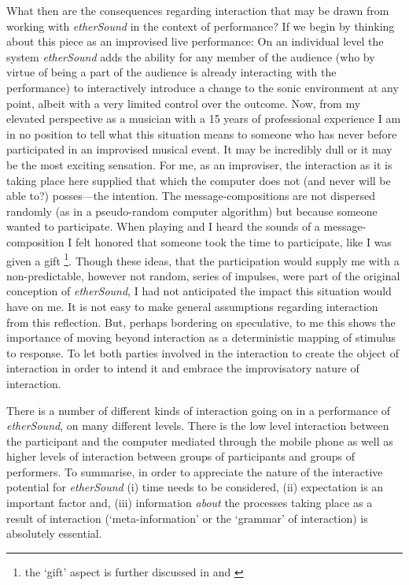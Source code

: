 What then are the consequences regarding interaction that may be drawn from working with \emph{etherSound} in the context of performance? If we begin by thinking about this piece as an improvised live performance: On an individual level the system \emph{etherSound} adds the ability for any member of the audience (who by virtue of being a part of the audience is already interacting with the performance) to interactively introduce a change to the sonic environment at any point, albeit with a very limited control over the outcome. Now, from my elevated perspective as a musician with a 15 years of professional experience I am in no position to tell what this situation means to someone who has never before participated in an improvised musical event. It may be incredibly dull or it may be the most exciting sensation. For me, as an improviser, the interaction as it is taking place here supplied that which the computer does not (and never will be able to?)  posses---the intention. The message-compositions are not dispersed randomly (as in a pseudo-random computer algorithm) but because someone wanted to participate. 
When playing and I heard the sounds of a message-composition I felt honored that someone took the time to participate, like I was given a gift \footnote{the `gift' aspect is further discussed in \citealp{frisk05} and   \citealp{yoshida06}}.  Though these ideas, that the participation would supply me with a non-predictable, however not random, series of impulses, were part of the original conception of \emph{etherSound}, I had not anticipated the impact this situation would have on me. It is not easy to make general assumptions regarding interaction from this reflection. But, perhaps bordering on speculative, to me this shows the importance of moving beyond interaction as a deterministic mapping of stimulus to response. To let both parties involved in the interaction to create the object of interaction in order to intend it and embrace the improvisatory nature of interaction. %

There is a number of different kinds of interaction going on in a performance of \emph{etherSound}, on many different levels. There is the low level interaction between the participant and the computer mediated through the mobile phone as well as higher levels of interaction between groups of participants and groups of performers. To summarise, in order to appreciate the nature of the interactive potential for \emph{etherSound} (i) time needs to be considered, (ii) expectation is an important factor and, (iii) information \emph{about} the processes taking place as a result of interaction (`meta-information' or the `grammar' of interaction) is absolutely essential. 

